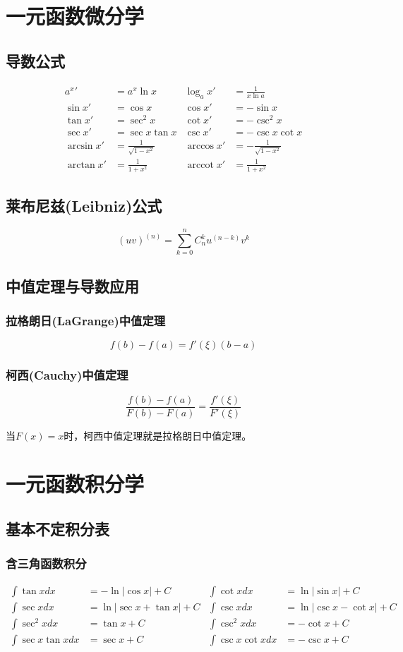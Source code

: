 \documentclass[a4paper,zihao=-4,UTF8]{ctexbook}
\begin{document}
\section{一元函数微分学}
\subsection{导数公式}
\begin{align*}
a^x{'}&=a^x\ln x & \log_a x'&=\frac{1}{x\ln a}\\
\sin x'&=\cos x   & \cos x'&=-\sin x \\
\tan x'&=\sec^2x  & \cot x'&=-\csc^2x\\
\sec x'&=\sec x\tan x & \csc x'&=-\csc x\cot x\\
\arcsin x' &=\frac{1}{\sqrt{1-x^2}}& \arccos x' &=-\frac{1}{\sqrt{1-x^2}}\\
\arctan x' &=\frac{1}{1+x^2}&\operatorname{arccot}x'&=\frac{1}{1+x^2}
\end{align*}
\subsection{莱布尼兹(Leibniz)公式}
\[(uv)^{(n)}=\sum_{k=0}^n C_n^k u^{(n-k)}v^{k}\]
\subsection{中值定理与导数应用}
\subsubsection{拉格朗日(LaGrange)中值定理}
\[f(b)-f(a)=f'(\xi)(b-a)\]
\subsubsection{柯西(Cauchy)中值定理}
\[\frac{f(b)-f(a)}{F(b)-F(a)}=\frac{f'(\xi)}{F'(\xi)}\]

当$F(x)=x$时，柯西中值定理就是拉格朗日中值定理。
\section{一元函数积分学}

\subsection{基本不定积分表}
\subsubsection{含三角函数积分}
\begin{align*}
 \int\tan xdx&=-\ln|\cos x|+C & \int\cot xdx&=\ln|\sin x|+C\\
 \int\sec xdx&=\ln|\sec x+\tan x|+C & \int\csc xdx&=\ln|\csc x-\cot x|+C\\
\int\sec^2 xdx&=\tan x+C&\int\csc^2 xdx &=-\cot x+C\\
\int\sec x\tan xdx&=\sec x+C&\int\csc x\cot xdx&=-\csc x+C
\end{align*}
\end{document}
